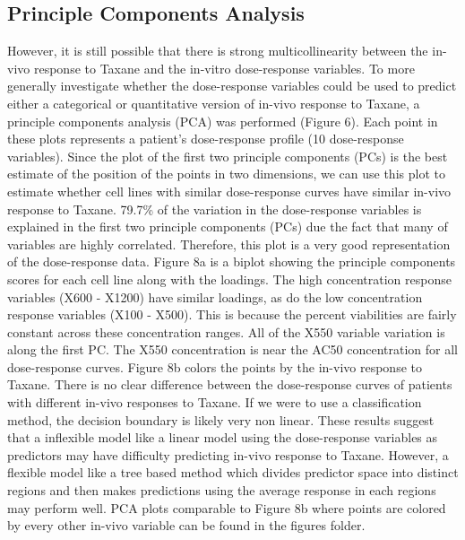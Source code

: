 \documentclass[12pt]{article}
\begin{document}
\subsection{Principle Components Analysis}
However, it is still possible that there is strong multicollinearity between the in-vivo response to Taxane and the in-vitro dose-response variables.  To more generally investigate whether the dose-response variables could be used to predict either a categorical or quantitative version of in-vivo response to Taxane, a principle components analysis (PCA) was performed (Figure 6).  Each point in these plots represents a patient's dose-response profile (10 dose-response variables).  Since the plot of the first two principle components (PCs) is the best estimate of the position of the points in two dimensions, we can use this plot to estimate whether cell lines with similar dose-response curves have similar in-vivo response to Taxane.  79.7\% of the variation in the dose-response variables is explained in the first two principle components (PCs) due the fact that many of variables are highly correlated. Therefore, this plot is a very good representation of the dose-response data. Figure 8a is a biplot showing the principle components scores for each cell line along with the loadings. The high concentration response variables (X600 - X1200) have similar loadings, as do the low concentration response variables (X100 - X500). This is because the percent viabilities are fairly constant across these concentration ranges.  All of the X550 variable variation is along the first PC.  The X550 concentration is near the AC50 concentration for all dose-response curves.  Figure 8b colors the points by the in-vivo response to Taxane.  There is no clear difference between the dose-response curves of patients with different in-vivo responses to Taxane.  If we were to use a classification method, the decision boundary is likely very non linear.  These results suggest that a inflexible model like a linear model using the dose-response variables as predictors may have difficulty predicting in-vivo response to Taxane.  However, a flexible model like a tree based method which divides predictor space into distinct regions and then makes predictions using the average response in each regions may perform well.  PCA plots comparable to Figure 8b where points are colored by every other in-vivo variable can be found in the figures folder.

\end{document}

